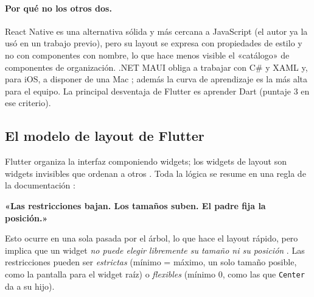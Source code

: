 \paragraph{Por qué no los otros dos.} React Native es una alternativa sólida y más cercana a JavaScript (el autor ya la usó en un trabajo previo), pero su layout se expresa con propiedades de estilo y no con componentes con nombre, lo que hace menos visible el «catálogo» de componentes de organización. .NET MAUI obliga a trabajar con C\# y XAML y, para iOS, a disponer de una Mac \cite{mauiwhat}; además la curva de aprendizaje es la más alta para el equipo. La principal desventaja de Flutter es aprender Dart (puntaje 3 en ese criterio).

\subsection{El modelo de layout de Flutter}
\label{sec:layout}
Flutter organiza la interfaz componiendo widgets; los widgets de layout son widgets invisibles que ordenan a otros \cite{flutterlayout}. Toda la lógica se resume en una regla de la documentación \cite{flutterconstr}:

\begin{center}\textbf{«Las restricciones bajan. Los tamaños suben. El padre fija la posición.»}\end{center}


Esto ocurre en una sola pasada por el árbol, lo que hace el layout rápido, pero implica que un widget \emph{no puede elegir libremente su tamaño ni su posición} \cite{flutterarq,flutterconstr}. Las restricciones pueden ser \emph{estrictas} (mínimo = máximo, un solo tamaño posible, como la pantalla para el widget raíz) o \emph{flexibles} (mínimo 0, como las que \texttt{Center} da a su hijo).

